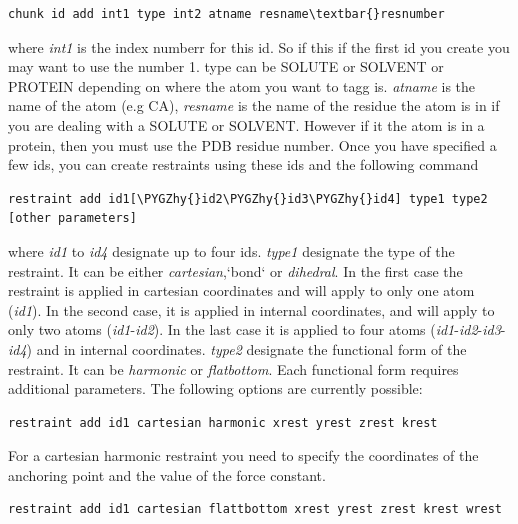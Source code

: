 \documentclass[letterpaper,10pt,english]{sphinxmanual}
\def\PYGZhy{\char`\-}
\begin{document}
\begin{Verbatim}[commandchars=\\\{\}]
chunk id add int1 type int2 atname resname\textbar{}resnumber
\end{Verbatim}

where \emph{int1} is the index numberr for this id. So if this if the first id you create you may want to use the number 1. type can be SOLUTE or SOLVENT or PROTEIN depending on where the atom you want to tagg is. \emph{atname} is the name of the atom (e.g CA), \emph{resname} is the name of the residue the atom is in if you are dealing with a SOLUTE or SOLVENT. However if it the atom is in a protein, then you must use the PDB residue number.
Once you have specified a few ids, you can create restraints using these ids and the following command

\begin{Verbatim}[commandchars=\\\{\}]
restraint add id1[\PYGZhy{}id2\PYGZhy{}id3\PYGZhy{}id4] type1 type2 [other parameters]
\end{Verbatim}

where \emph{id1} to \emph{id4} designate up to four ids. \emph{type1} designate the type of the restraint. It can be either \emph{cartesian},{}`bond{}` or \emph{dihedral}. In the first case the restraint is applied in cartesian coordinates and will apply to only one atom (\emph{id1}). In the second case, it is applied in internal coordinates, and will apply to only two atoms (\emph{id1}-\emph{id2}). In the last case it is applied to four atoms (\emph{id1}-\emph{id2}-\emph{id3}-\emph{id4}) and in internal coordinates. \emph{type2} designate the functional form of the restraint. It can be \emph{harmonic} or \emph{flatbottom}. Each functional form requires additional parameters. The following options are currently possible:

\begin{Verbatim}[commandchars=\\\{\}]
restraint add id1 cartesian harmonic xrest yrest zrest krest
\end{Verbatim}

For a cartesian harmonic restraint you need to specify the coordinates of the anchoring point and the value of the force constant.

\begin{Verbatim}[commandchars=\\\{\}]
restraint add id1 cartesian flattbottom xrest yrest zrest krest wrest
\end{Verbatim}
\end{document}
